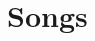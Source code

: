 \documentclass{article}
\begin{document}
\tableofcontents

\newpage

\part{Songs}

\newpage

% 
%
% 
%
% 
%
% 
%
% 
%
% 
%
% 
%
% 
%
% 
%
% 
%
\end{document}
